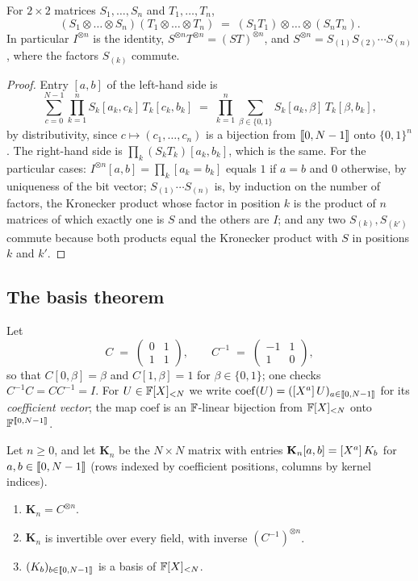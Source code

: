 \begin{lemma}\label{lem:kron}
For $2 \times 2$ matrices $S_1,\dots,S_n$ and $T_1,\dots,T_n$,
\[
  (S_1 \otimes \dots \otimes S_n)(T_1 \otimes \dots \otimes T_n) \;=\; (S_1T_1) \otimes \dots \otimes (S_nT_n).
\]
In particular $I^{\otimes n}$ is the identity, $S^{\otimes n}T^{\otimes n} = (ST)^{\otimes n}$, and $S^{\otimes n} = S_{(1)} S_{(2)} \cdots S_{(n)}$, where the factors $S_{(k)}$ commute.
\end{lemma}

\begin{proof}
Entry $[a,b]$ of the left-hand side is
\[
  \sum_{c=0}^{N-1} \prod_{k=1}^{n} S_k[a_k,c_k]\,T_k[c_k,b_k] \;=\; \prod_{k=1}^{n} \sum_{\beta \in \{0,1\}} S_k[a_k,\beta]\,T_k[\beta,b_k],
\]
by distributivity, since $c \mapsto (c_1,\dots,c_n)$ is a bijection from $\llbracket 0, N-1 \rrbracket$ onto $\{0,1\}^n$.
The right-hand side is $\prod_k (S_kT_k)[a_k,b_k]$, which is the same.
For the particular cases: $I^{\otimes n}[a,b] = \prod_k [a_k = b_k]$ equals $1$ if $a = b$ and $0$ otherwise, by uniqueness of the bit vector; $S_{(1)}\cdots S_{(n)}$ is, by induction on the number of factors, the Kronecker product whose factor in position $k$ is the product of $n$ matrices of which exactly one is $S$ and the others are $I$; and any two $S_{(k)}, S_{(k')}$ commute because both products equal the Kronecker product with $S$ in positions $k$ and $k'$.
\end{proof}

\subsection{The basis theorem}\label{sec:kernel:basis}

Let
\[
  C \;=\; \begin{pmatrix} 0 & 1 \\ 1 & 1 \end{pmatrix},
  \qquad
  C^{-1} \;=\; \begin{pmatrix} -1 & 1 \\ 1 & 0 \end{pmatrix},
\]
so that $C[0,\beta] = \beta$ and $C[1,\beta] = 1$ for $\beta \in \{0,1\}$; one checks $C^{-1}C = CC^{-1} = I$.
For $U \in \mathbb{F}[X]_{<N}$ we write $\mathrm{coef}(U) = ([X^{a}]\,U)_{a \in \llbracket 0, N-1 \rrbracket}$ for its \emph{coefficient vector}; the map $\mathrm{coef}$ is an $\mathbb{F}$-linear bijection from $\mathbb{F}[X]_{<N}$ onto $\mathbb{F}^{\llbracket 0, N-1 \rrbracket}$.

\begin{theorem}\label{thm:basis}
Let $n \ge 0$, and let $\mathbf{K}_n$ be the $N \times N$ matrix with entries $\mathbf{K}_n[a,b] = [X^{a}]\,K_b$ for $a, b \in \llbracket 0, N-1 \rrbracket$ (rows indexed by coefficient positions, columns by kernel indices).
\begin{enumerate}
  \item $\mathbf{K}_n = C^{\otimes n}$.
  \item $\mathbf{K}_n$ is invertible over every field, with inverse $(C^{-1})^{\otimes n}$.
  \item $(K_b)_{b \in \llbracket 0, N-1 \rrbracket}$ is a basis of $\mathbb{F}[X]_{<N}$.
\end{enumerate}
\end{theorem}

